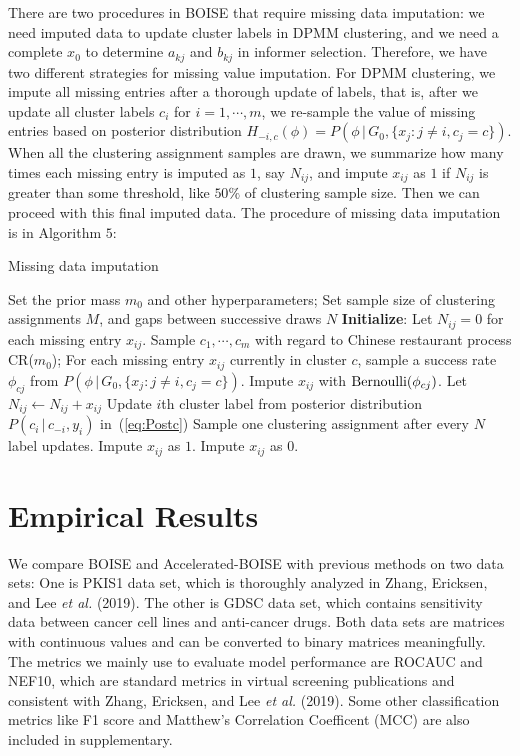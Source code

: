 \documentclass[12pt]{article}
\begin{document}
There are two procedures in BOISE that require missing data imputation: we need imputed data to update cluster labels in DPMM clustering, and we need a complete $x_0$ to determine $a_{kj}$ and $b_{kj}$ in informer selection. Therefore, we have two different strategies for missing value imputation. For DPMM clustering, we impute all missing entries after a thorough update of labels, that is, after we update all cluster labels $c_i$ for $i=1,\cdots,m$, we re-sample the value of missing entries based on posterior distribution $H_{-i,c}(\phi) = P\left(\phi\,|\,G_0,\{x_j:j\neq i, c_j = c\} \right)$. When all the clustering assignment samples are drawn, we summarize how many times each missing entry is imputed as $1$, say $N_{ij}$, and impute $x_{ij}$ as $1$ if $N_{ij}$ is greater than some threshold, like $50\%$ of clustering sample size. Then we can proceed with this final imputed data. The procedure of missing data imputation is in Algorithm $5$:

\begin{algorithm}
\caption{Missing data imputation}\label{Algo5}
\begin{algorithmic}[1]
\State Set the prior mass $m_0$ and other hyperparameters;
\State Set sample size of clustering assignments $M$, and gaps between successive draws $N$
\State \textbf{Initialize}: Let $N_{ij} = 0$ for each missing entry $x_{ij}$. Sample $c_1,\cdots,c_m$ with regard to Chinese restaurant process CR($m_0$);
    \State For each missing entry $x_{ij}$ currently in cluster $c$, sample a success rate $\phi_{cj}$ from $P\left(\phi\,|\,G_0,\{x_j:j\neq i, c_j = c\} \right)$.
    \State Impute $x_{ij}$ with ${\rm Bernoulli}(\phi_{cj})$. Let $N_{ij} \gets N_{ij}+x_{ij}$
        \State Update $i$th cluster label from posterior distribution $P(c_i\,|\,c_{-i},y_i)$ in~(\ref{eq:Postc})
    \EndFor
\State Sample one clustering assignment after every $N$ label updates.
\EndWhile
{}
    \State Impute $x_{ij}$ as $1$.
\Else
    \State Impute $x_{ij}$ as $0$.
\EndIf
\end{algorithmic}
\end{algorithm} 

\section{Empirical Results}
We compare BOISE and Accelerated-BOISE with previous methods on two data sets: One is PKIS1 data set, which is thoroughly analyzed in  Zhang, Ericksen, and Lee {\em et al.} (2019). The other is GDSC data set, which contains sensitivity data between cancer cell lines and anti-cancer drugs. Both data sets are matrices with continuous values and can be converted to binary matrices meaningfully. The metrics we mainly use to evaluate model performance are ROCAUC and NEF10, which are standard metrics in virtual screening publications and consistent with Zhang, Ericksen, and Lee {\em et al.} (2019). Some other  classification metrics like F1 score and Matthew's Correlation Coefficent (MCC) are also included in supplementary. 
\end{document}
